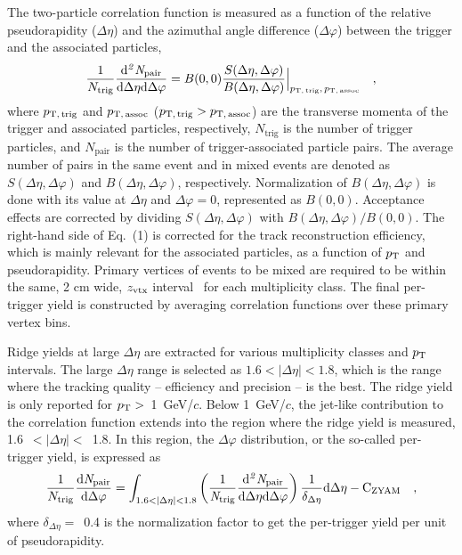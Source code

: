 The two-particle correlation function is measured as a function of the relative pseudorapidity ($\Delta\eta$) and the azimuthal angle difference ($\Delta\varphi$) between the trigger and the associated particles,
\begin{eqnarray}
\frac{1}{N_{\rm{trig}}} \frac{ \rm{d}\it{}^{2} N_{\rm{pair}} }{ \rm{d} \Delta\eta \rm{d}\Delta\varphi} = B(0, 0)\frac{S(\Delta\eta, \Delta\varphi)}{B(\Delta\eta, \Delta\varphi)}  \Big\lvert_{p_\mathrm{T,\,trig},\,p_\mathrm{T,\,assoc}}\quad , 
\label{eq:corrfunction}
\end{eqnarray}
where $p_\mathrm{T,\,trig}$ and $p_\mathrm{T,\,assoc}$ ($p_\mathrm{T,\,trig}>p_\mathrm{T,\,assoc}$) are the transverse momenta of the trigger and associated particles, respectively, $N_\mathrm{trig}$ is the number of trigger particles, and $N_\mathrm{pair}$ is the number of trigger-associated particle pairs. The average number of pairs in the same event and in mixed events are denoted as $S(\Delta\eta, \Delta\varphi)$ and $B(\Delta\eta, \Delta\varphi)$, respectively. Normalization of $B(\Delta\eta, \Delta\varphi)$ is done with its value at $\Delta\eta$ and $\Delta\varphi = 0$, represented as $B (0,0)$. Acceptance effects are corrected by dividing $S(\Delta\eta, \Delta\varphi)$ with $B(\Delta\eta, \Delta\varphi)/B (0,0)$. The right-hand side of Eq.~(1) is corrected for the track reconstruction efficiency, which is mainly relevant for the associated particles, as a function of $p_\mathrm{T}$ and pseudorapidity. Primary vertices of events to be mixed are required to be within the same, 2 cm wide, $z_{\rm{vtx}}$ interval~\cite{KOPYLOV1974472:evtmixing,Adam:2016tsv} for each multiplicity class. The final per-trigger yield is constructed by averaging correlation functions over these primary vertex bins.

Ridge yields at large $\Delta\eta$ are extracted for various multiplicity classes and $p_\mathrm{T}$ intervals. The large $\Delta\eta$ range is selected as $1.6<|\Delta\eta|<1.8$, which is the range where the tracking quality -- efficiency and precision -- is the best. The ridge yield is only reported for $p_\mathrm{T}>$~1~GeV/$c$. Below 1~GeV/$c$, the jet-like contribution to the correlation function extends into the region where the ridge yield is measured, 1.6~$<|\Delta\eta|<$~1.8. In this region, the $\Delta\varphi$ distribution, or the so-called per-trigger yield, is expressed as
\begin{eqnarray}
\frac{1}{N_{\rm{trig}}} \frac{ \rm{d}\it{}N_{\rm{pair}} }{ \rm{d}\Delta\varphi } = \int_{1.6<|\Delta \eta|<1.8} \left( \frac{1}{\it{N}_{\rm{trig}}} \frac{ \rm{d}\it{}^{2} N_{\rm{pair}} }{ \rm{d}\Delta\eta d\Delta\varphi} \right) \dfrac{1}{\delta_{\Delta\eta}} \rm{d}\Delta \eta - C_{\rm{ZYAM}}\quad ,
\end{eqnarray}
where $\delta_{\Delta\eta}=$~0.4 is the normalization factor to get the per-trigger yield per unit of pseudorapidity. 

